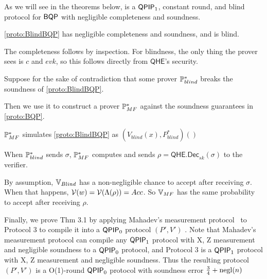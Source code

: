 As we will see in the theorems below,  is a $\operatorname{\mathsf{QPIP}}_1$, constant round, and blind protocol for $\operatorname{\mathsf{BQP}}$ with negligible completeness and soundness.

\begin{thm}
	\cref{proto:BlindBQP} has negligible completeness and soundness, and is blind.
\end{thm}
\begin{prf}
	The completeness follows by inspection.
	For blindness, the only thing the prover sees is $c$ and $evk$, so this follows directly from $\mathsf{QHE}$'s security.

	
	
	Suppose for the sake of contradiction that some prover $\mathbb{P}_{blind}^*$ breaks the soundness of \cref{proto:BlindBQP}.

	Then we use it to construct a prover $\mathbb{P}_{MF}^*$ against the soundness guarantees in \cref{proto:BQP}.

	$\mathbb{P}_{MF}^*$ simulates \cref{proto:BlindBQP} as $(V_{blind}(x), P_{blind}^*)()$
	

	When $\mathbb{P}_{blind}^*$ sends $\sigma$, $\mathbb{P}_{MF}^*$ computes and sends $\rho=\mathsf{QHE.Dec}_{sk}(\sigma)$ to the verifier. 

	By assumption, $\mathbb{V}_{Blind}$ has a non-negligible chance to accept after receiving $\sigma$.
	When that happens, $\mathcal{V}(w)=\mathcal{V}(\Lambda(\rho))=Acc$.
	So $\mathbb{V}_{MF}$ has the same probability to accept after receiving $\rho$.
\end{prf}


Finally, we prove Thm 3.1 by applying Mahadev's measurement protocol~\cite{mahadev_delegation} to Protocol 3 to compile it into a $\operatorname{\mathsf{QPIP}}_0$ protocol $(P', V')$ .
Note that Mahadev's measurement protocol can compile any $\operatorname{\mathsf{QPIP}}_1$ protocol with X, Z measurement and negligible soundness to a $\operatorname{\mathsf{QPIP}}_0$ protocol, and Protocol 3 is a $\operatorname{\mathsf{QPIP}}_1$ protocol with X, Z measurement and negligible soundness.
Thus the resulting protocol $(P', V')$ is a O(1)-round $\operatorname{\mathsf{QPIP}}_0$ protocol with soundness error $\frac{3}{4} + \operatorname{negl}(n)$

